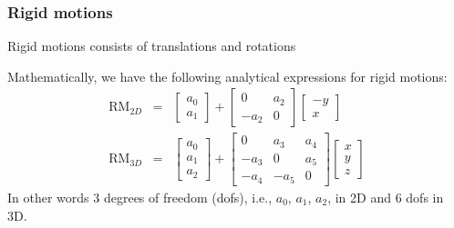 \begin{frame}
\frametitle{Rigid motions}
Rigid motions consists of translations and rotations 

\vspace{0.3cm}
Mathematically, we have the following analytical expressions for rigid motions: 
\begin{eqnarray}
\operatorname{RM}_{2D} &=& \left[\begin{array}{c} a_0 \\ a_1 \end{array}\right] + 
\left[\begin{array}{cc} 0 &  a_2 \\ -a_2 & 0 \end{array} \right] 
\left[\begin{array}{c} -y\\ x\end{array} \right] \\ 
\operatorname{RM}_{3D} &=& \left[\begin{array}{c} a_0 \\ a_1 \\ a_2 \end{array}\right]
     + \left[\begin{array}{ccc} 0 & a_3 & a_4 \\
                               -a_3 & 0 & a_5\\
                               -a_4 & -a_5 & 0
             \end{array}\right]
 \left[\begin{array}{c}
x\\ y \\ z \end{array} \right]
\end{eqnarray}
In other words 3 degrees of freedom (dofs), i.e., $a_0$, $a_1$, $a_2$, in 2D and
6 dofs in 3D. 

\end{frame}
